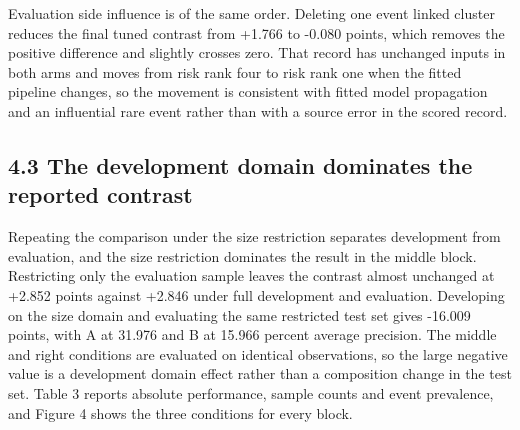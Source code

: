 \documentclass[10pt,a4paper,twocolumn]{article}
\begin{document}
\par\vspace{4pt}\par\vspace{4pt}

Evaluation side influence is of the same order. Deleting one event linked cluster reduces the final tuned contrast from +1.766 to -0.080 points, which removes the positive difference and slightly crosses zero. That record has unchanged inputs in both arms and moves from risk rank four to risk rank one when the fitted pipeline changes, so the movement is consistent with fitted model propagation and an influential rare event rather than with a source error in the scored record.

\subsection{4.3 The development domain dominates the reported contrast}

Repeating the comparison under the size restriction separates development from evaluation, and the size restriction dominates the result in the middle block. Restricting only the evaluation sample leaves the contrast almost unchanged at +2.852 points against +2.846 under full development and evaluation. Developing on the size domain and evaluating the same restricted test set gives -16.009 points, with A at 31.976 and B at 15.966 percent average precision. The middle and right conditions are evaluated on identical observations, so the large negative value is a development domain effect rather than a composition change in the test set. Table 3 reports absolute performance, sample counts and event prevalence, and Figure 4 shows the three conditions for every block.
\end{document}
